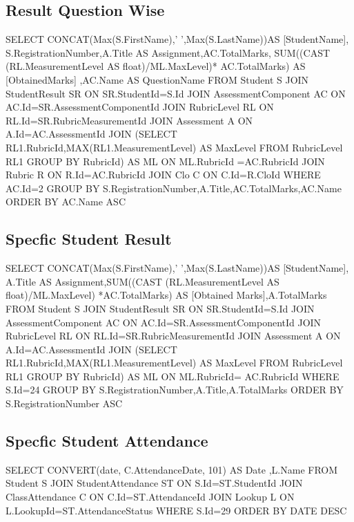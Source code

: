 \documentclass[12pt,a4paper]{article}
\begin{document}
\subsection{Result Question Wise}
\begin{sql}[style=sqlStyle]
SELECT CONCAT(Max(S.FirstName),' ',Max(S.LastName))AS [StudentName],
S.RegistrationNumber,A.Title AS Assignment,AC.TotalMarks,
SUM((CAST (RL.MeasurementLevel AS float)/ML.MaxLevel)*
AC.TotalMarks) AS [ObtainedMarks]
,AC.Name AS QuestionName
FROM Student S
JOIN StudentResult SR
ON SR.StudentId=S.Id
JOIN AssessmentComponent AC
ON AC.Id=SR.AssessmentComponentId
JOIN RubricLevel RL
ON RL.Id=SR.RubricMeasurementId
JOIN  Assessment A
ON A.Id=AC.AssessmentId
JOIN (SELECT RL1.RubricId,MAX(RL1.MeasurementLevel) AS MaxLevel FROM
 RubricLevel RL1 GROUP BY RubricId) AS ML
ON ML.RubricId
=AC.RubricId
JOIN Rubric R
ON R.Id=AC.RubricId
JOIN Clo C
ON C.Id=R.CloId
WHERE AC.Id=2
GROUP BY S.RegistrationNumber,A.Title,AC.TotalMarks,AC.Name
ORDER BY  AC.Name ASC
\end{sql}
\subsection{Specfic Student Result }
\begin{sql}[style=sqlStyle]
SELECT CONCAT(Max(S.FirstName),' ',Max(S.LastName))AS [StudentName],
A.Title AS Assignment,SUM((CAST (RL.MeasurementLevel
AS float)/ML.MaxLevel)
*AC.TotalMarks) AS [Obtained Marks],A.TotalMarks
FROM Student S
JOIN StudentResult SR
ON SR.StudentId=S.Id
JOIN AssessmentComponent AC
ON AC.Id=SR.AssessmentComponentId
JOIN RubricLevel RL
ON RL.Id=SR.RubricMeasurementId
JOIN  Assessment A
ON A.Id=AC.AssessmentId
JOIN (SELECT RL1.RubricId,MAX(RL1.MeasurementLevel) AS MaxLevel 
FROM RubricLevel RL1 GROUP BY RubricId) AS ML
ON ML.RubricId=
AC.RubricId
WHERE S.Id=24
GROUP BY S.RegistrationNumber,A.Title,A.TotalMarks
ORDER BY S.RegistrationNumber ASC
\end{sql}
\subsection{Specfic Student Attendance }
\begin{sql}[style=sqlStyle]
SELECT  CONVERT(date,  C.AttendanceDate, 101) AS Date ,L.Name
FROM Student S
JOIN StudentAttendance ST
ON S.Id=ST.StudentId
JOIN ClassAttendance C
ON C.Id=ST.AttendanceId
JOIN Lookup L
ON L.LookupId=ST.AttendanceStatus
WHERE S.Id=29
ORDER BY DATE DESC
\end{sql}
\end{document}
